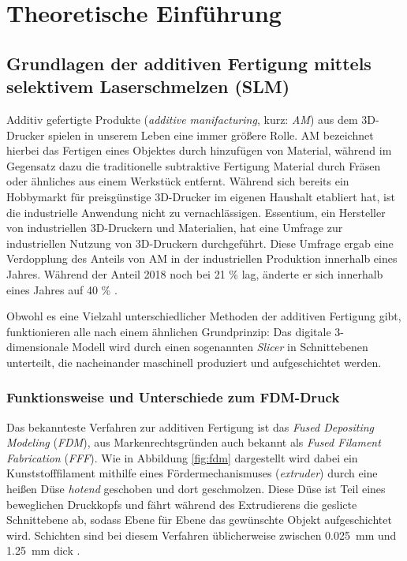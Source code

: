\chapter{Theoretische Einführung}



\section{Grundlagen der additiven Fertigung mittels selektivem Laserschmelzen (SLM)}
	Additiv gefertigte Produkte (\emph{additive manifacturing}, kurz: \emph{AM}) aus dem
	3D-Drucker spielen in unserem Leben eine immer größere Rolle. AM bezeichnet hierbei das
	Fertigen eines Objektes durch hinzufügen von Material, während im Gegensatz dazu die
	traditionelle subtraktive Fertigung Material durch Fräsen oder ähnliches aus einem Werkstück
	entfernt. Während sich bereits ein Hobbymarkt für preisgünstige 3D-Drucker im eigenen Haushalt
	etabliert hat, ist die industrielle Anwendung nicht zu vernachlässigen. Essentium, ein
	Hersteller von industriellen 3D-Druckern und Materialien, hat eine Umfrage zur industriellen
	Nutzung von 3D-Druckern durchgeführt. Diese Umfrage ergab eine Verdopplung des Anteils von AM
	in der industriellen Produktion innerhalb eines Jahres. Während der Anteil 2018 noch bei 21 \%
	lag, änderte er sich innerhalb eines Jahres auf 40 \% \cite{stevenson2019survey}.

	Obwohl es eine Vielzahl unterschiedlicher Methoden der additiven Fertigung gibt, funktionieren
	alle nach einem ähnlichen Grundprinzip: Das digitale 3-dimension\-ale Modell wird durch einen
	sogenannten \emph{Slicer} in Schnittebenen unterteilt, die nacheinander maschinell produziert
	und aufgeschichtet werden.

	\subsection{Funktionsweise und Unterschiede zum FDM-Druck}
		Das bekannteste Verfahren zur additiven Fertigung ist das \emph{Fused Depositing Modeling}
		(\emph{FDM}), aus Markenrechtsgründen auch bekannt als \emph{Fused Filament Fabrication}
		(\emph{FFF}). Wie in Abbildung \ref{fig:fdm} dargestellt wird dabei ein Kunststofffilament
		mithilfe eines Fördermechanismuses (\emph{extruder}) durch eine heißen Düse \emph{hotend}
		geschoben und dort geschmolzen. Diese Düse ist Teil eines beweglichen Druckkopfs und fährt
		während des Extrudierens die geslicte Schnittebene ab, sodass Ebene für Ebene das
		gewünschte Objekt aufgeschichtet wird. Schichten sind bei diesem Verfahren üblicherweise
		zwischen \SI{0,025}{\milli\meter} und \SI{1,25}{\milli\meter} dick
		\cite{wikipedia2021fused}.

